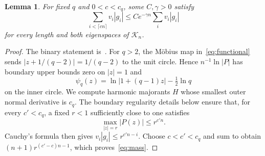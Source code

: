 \documentclass[12pt,letterpaper,onecolumn]{article}
\newtheorem{lemma}[theorem]{Lemma}
\newcommand{\K}{\mathcal K}
\begin{document}
\begin{lemma}\label{lem:concentration}
For fixed $q$ and $0<c<c_q$, some $C,\gamma>0$ satisfy
\begin{equation}\label{eq:mass}
\sum_{i<\lceil cn\rceil}v_i|g_i|
\le Ce^{-\gamma n}\sum_i v_i|g_i|
\end{equation}
for every length and both eigenspaces of $\K_n$.
\end{lemma}
\begin{proof}
The binary statement is~\cite[Theorem~3.4]{salmon}. For $q>2$, the M\"obius map in~\eqref{eq:functional} sends
$|z+1/(q-2)|=1/(q-2)$ to the unit circle. Hence $n^{-1}\ln|P|$ has boundary upper bounds zero on $|z|=1$ and
\begin{equation}\label{eq:psi}
\psi_q(z)=\ln|1+(q-1)z|-\tfrac12\ln q
\end{equation}
on the inner circle. We compute harmonic majorants $H$ whose smallest outer normal derivative is $c_q$. The boundary regularity details below ensure that, for every $c'<c_q$, a fixed $r<1$ sufficiently close to one satisfies
\begin{equation}\label{eq:circle}
\max_{|z|=r}|P(z)|\le r^{c'n}.
\end{equation}
Cauchy's formula then gives $v_i|g_i|\le r^{c'n-i}$. Choose $c<c'<c_q$ and sum to obtain
$(n+1)r^{(c'-c)n-1}$, which proves~\eqref{eq:mass}.


\end{proof}
\end{document}
